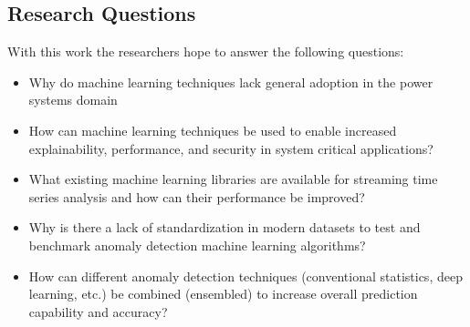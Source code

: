 \subsection{Research Questions}
With this work the researchers hope to answer the following questions:
\begin{itemize}
    \item Why do machine learning techniques lack general adoption in the power systems domain
    \item How can machine learning techniques be used to enable increased explainability, performance, and security in system critical applications?
    \item What existing machine learning libraries are available for streaming time series analysis and how can their performance be improved?
    \item Why is there a lack of standardization in modern datasets to test and benchmark anomaly detection machine learning algorithms?
    \item How can different anomaly detection techniques (conventional statistics, deep learning, etc.) be combined (ensembled) to increase overall prediction capability and accuracy?
\end{itemize}

